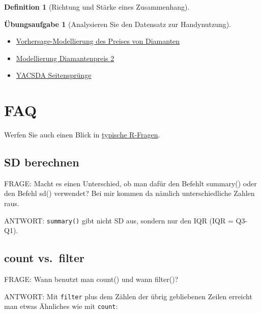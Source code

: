 \documentclass[
  a4paper,
  DIV=11]{scrreprt}
\newenvironment{Shaded}{\begin{snugshade}}{\end{snugshade}}
\newcommand{\DocumentationTok}[1]{\textcolor[rgb]{0.37,0.37,0.37}{\textit{#1}}}
\newcommand{\FunctionTok}[1]{\textcolor[rgb]{0.28,0.35,0.67}{#1}}
\newcommand{\NormalTok}[1]{\textcolor[rgb]{0.00,0.23,0.31}{#1}}
\newcommand{\SpecialCharTok}[1]{\textcolor[rgb]{0.37,0.37,0.37}{#1}}
\theoremstyle{definition}
\newtheorem{exercise}{Übungsaufgabe}[chapter]
\theoremstyle{definition}
\theoremstyle{definition}
\newtheorem{definition}{Definition}[chapter]
\theoremstyle{remark}
\begin{document}
\begin{definition}[Richtung und Stärke eines
Zusammenhang]
\begin{exercise}[Analysieren Sie den Datensatz zur
Handynutzung]
\begin{itemize}
{  Study: Italian restaurants in NYC}
\item
  \href{https://data-se.netlify.app/2021/05/19/vohrersgage-modellierung-des-preises-von-diamanten/}{Vorhersage-Modellierung
  des Preises von Diamanten}
\item
  \href{https://data-se.netlify.app/2021/05/25/modellierung-diamantenpreis-2/}{Modellierung
  Diamantenpreis 2}
\item
  \href{https://data-se.netlify.app/2021/05/28/yacsda-seitenspr\%C3\%BCnge/}{YACSDA
  Seitensprünge}
\end{itemize}

\section{FAQ}\label{faq}

Werfen Sie auch einen Blick in \hyperref[sec-r-faq]{typische R-Fragen}.

\subsection{SD berechnen}\label{sd-berechnen}

FRAGE: Macht es einen Unterschied, ob man dafür den Befehlt summary()
oder den Befehl sd() verwendet? Bei mir kommen da nämlich
unterschiedliche Zahlen raus.

ANTWORT: \texttt{summary()} gibt nicht SD aus, sondern nur den IQR (IQR
= Q3-Q1).

\begin{Shaded}
\end{Shaded}

\subsection{count vs.~filter}\label{count-vs.-filter}

FRAGE: Wann benutzt man count() und wann filter()?

ANTWORT: Mit \texttt{filter} plus dem Zählen der übrig gebliebenen
Zeilen erreicht man etwas Ähnliches wie mit \texttt{count}:


\end{exercise}
\end{definition}
\end{document}
